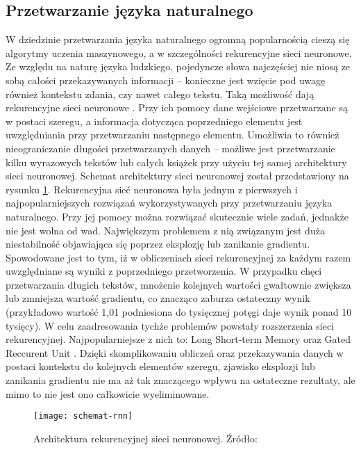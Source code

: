 \subsection{Przetwarzanie języka naturalnego}
W dziedzinie przetwarzania języka naturalnego ogromną popularnością cieszą się algorytmy uczenia maszynowego, a w szczególności rekurencyjne sieci neuronowe. Ze względu na naturę języka ludzkiego, pojedyncze słowa najczęściej nie niosą ze sobą całości przekazywanych informacji -- konieczne jest wzięcie pod uwagę również kontekstu zdania, czy nawet całego tekstu. Taką możliwość dają rekurencyjne sieci neuronowe \cite{rnn}. Przy ich pomocy dane wejściowe przetwarzane są w postaci szeregu, a informacja dotycząca poprzedniego elementu jest uwzględniania przy przetwarzaniu następnego elementu. Umożliwia to również nieograniczanie długości przetwarzanych danych -- możliwe jest przetwarzanie kilku wyrazowych tekstów lub całych książek przy użyciu tej samej architektury sieci neuronowej. Schemat architektury sieci neuronowej został przedstawiony na rysunku \ref{fig:schemat-rnn}. Rekurencyjna sieć neuronowa była jednym z pierwszych i najpopularniejszych rozwiązań wykorzystywanych przy przetwarzaniu języka naturalnego. Przy jej pomocy można rozwiązać skutecznie wiele zadań, jednakże nie jest wolna od wad. Największym problemem z nią związanym jest duża niestabilność objawiająca się poprzez eksplozję lub zanikanie gradientu. Spowodowane jest to tym, iż w obliczeniach sieci rekurencyjnej za każdym razem uwzględniane są wyniki z poprzedniego przetworzenia. W przypadku chęci przetwarzania długich tekstów, mnożenie kolejnych wartości gwałtownie zwiększa lub zmniejsza wartość gradientu, co znacząco zaburza ostateczny wynik (przykładowo wartość 1,01 podniesiona do tysięcznej potęgi daje wynik ponad 10 tysięcy). W celu zaadresowania tychże problemów powstały rozszerzenia sieci rekurencyjnej. Najpopularniejsze z nich to: Long Short-term Memory \cite{lstm} oraz Gated Reccurent Unit \cite{gru}. Dzięki skomplikowaniu obliczeń oraz przekazywania danych w postaci kontekstu do kolejnych elementów szeregu, zjawisko eksplozji lub zanikania gradientu nie ma aż tak znaczącego wpływu na ostateczne rezultaty, ale mimo to nie jest ono całkowicie wyeliminowane.
\begin{figure}[H]
  \centering
  \texttt{[image: schemat-rnn]}
  \caption{Architektura rekurencyjnej sieci neuronowej. Źródło: \cite{WikipediaEN:RNN}}
  \label{fig:schemat-rnn}
\end{figure}
